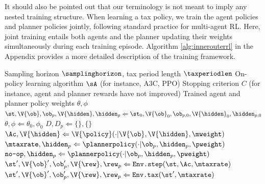 It should also be pointed out that our terminology is not meant to imply any nested training structure.
When learning a tax policy, we train the agent policies and planner policies jointly, following standard practice for multi-agent RL. Here, joint training entails both agents and the planner updating their weights simultaneously during each training episode.
Algorithm \ref{alg:innerouterrl} in the Appendix provides a more detailed description of the training framework.
\begin{algorithm}[t]
    \caption{Inner-Outer Loop Reinforcement Learning. Economic agents and social planner learn simultaneously. Bold-faced symbols indicate quantities for multiple agents. Note that agents share weights.}
    \label{alg:innerouterrl}
\begin{algorithmic}
    \Require Sampling horizon $\samplinghorizon$, tax period length $\taxperiodlen$
    \Require On-policy learning algorithm $\sA$ (for instance, A3C, PPO)
    \Require Stopping criterion $C$ (for instance, agent and planner rewards have not improved)
    \Ensure Trained agent and planner policy weights $\theta, \phi$
    \State $\st, \V{\ob}, \ob_p, \V{\hidden}, \hidden_p \Leftarrow \st_0, \V{\ob}_0, \ob_{p, 0}, \V{\hidden}_0, \hidden_{p, 0}$ 
    \State $\theta, \phi \Leftarrow \theta_0, \phi_0$ 
    \State $D, D_p \Leftarrow \{\}, \{\}$ 
        \State $\Ac, \V{\hidden} \Leftarrow \V{\policy}(\cdot | \V{\ob}, \V{\hidden}, \mweight)$ 
          
            \State $\mtaxrate, \hidden_p \Leftarrow \plannerpolicy(\cdot | \ob_p, \hidden_p, \pweight)$ 
        \Else
            \State $\texttt{no-op}, \hidden_p \Leftarrow \plannerpolicy(\cdot | \ob_p, \hidden_p, \pweight)$ 
        \EndIf
        \State $\st', \V{\ob}', \ob_p', \V{\rew}, \rew_p \Leftarrow \texttt{Env.step}(\st, \Ac, \mtaxrate)$  
          
            \State $\st', \V{\ob}', \ob_p', \V{\rew}, \rew_p \Leftarrow \texttt{Env.tax}(\st', \mtaxrate)$  

\end{algorithmic}
\end{algorithm}
